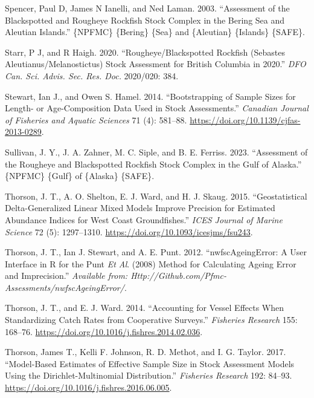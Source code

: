 \documentclass[
]{scrartcl}
\newlength{\cslhangindent}
\newenvironment{CSLReferences}[2] %
 {\begin{list}{}{%
  \setlength{\itemindent}{0pt}
  \setlength{\leftmargin}{0pt}
  \setlength{\parsep}{0pt}
  \ifodd #1
   \setlength{\leftmargin}{\cslhangindent}
   \setlength{\itemindent}{-1\cslhangindent}
  \fi
  \setlength{\itemsep}{#2\baselineskip}}}
 {\end{list}}
\begin{document}
\begin{CSLReferences}{1}{0}
Spencer, Paul D, James N Ianelli, and Ned Laman. 2003. {``Assessment of
the {Blackspotted} and {Rougheye} {Rockfish} {Stock} {Complex} in the
{Bering} {Sea} and {Aleutian} {Islands}.''} \{NPFMC\} \{Bering\} \{Sea\}
and \{Aleutian\} \{Islands\} \{SAFE\}.

Starr, P J, and R Haigh. 2020. {``Rougheye/{Blackspotted} {Rockfish}
({Sebastes} Aleutianus/Melanostictus) Stock Assessment for {British}
{Columbia} in 2020.''} \emph{DFO Can. Sci. Advis. Sec. Res. Doc.}
2020/020: 384.

Stewart, Ian J., and Owen S. Hamel. 2014. {``Bootstrapping of Sample
Sizes for Length- or Age-Composition Data Used in Stock Assessments.''}
\emph{Canadian Journal of Fisheries and Aquatic Sciences} 71 (4):
581--88. \url{https://doi.org/10.1139/cjfas-2013-0289}.

Sullivan, J. Y., J. A. Zahner, M. C. Siple, and B. E. Ferriss. 2023.
{``Assessment of the {Rougheye} and {Blackspotted} {Rockfish} Stock
Complex in the {Gulf} of {Alaska}.''} \{NPFMC\} \{Gulf\} of \{Alaska\}
\{SAFE\}.

Thorson, J. T., A. O. Shelton, E. J. Ward, and H. J. Skaug. 2015.
{``Geostatistical Delta-Generalized Linear Mixed Models Improve
Precision for Estimated Abundance Indices for {West} {Coast}
Groundfishes.''} \emph{ICES Journal of Marine Science} 72 (5):
1297--1310. \url{https://doi.org/10.1093/icesjms/fsu243}.

Thorson, J. T., Ian J. Stewart, and A. E. Punt. 2012.
{``{nwfscAgeingError}: A User Interface in {R} for the {P}unt \emph{Et
Al}. (2008) Method for Calculating Ageing Error and Imprecision.''}
\emph{Available from:
Http://Github.com/Pfmc-Assessments/nwfscAgeingError/}.

Thorson, J. T., and E. J. Ward. 2014. {``Accounting for Vessel Effects
When Standardizing Catch Rates from Cooperative Surveys.''}
\emph{Fisheries Research} 155: 168--76.
\url{https://doi.org/10.1016/j.fishres.2014.02.036}.

Thorson, James T., Kelli F. Johnson, R. D. Methot, and I. G. Taylor.
2017. {``Model-Based Estimates of Effective Sample Size in Stock
Assessment Models Using the {Dirichlet}-Multinomial Distribution.''}
\emph{Fisheries Research} 192: 84--93.
\url{https://doi.org/10.1016/j.fishres.2016.06.005}.


\end{CSLReferences}
\end{document}
